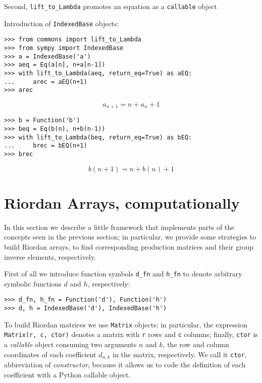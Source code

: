 Second, \verb|lift_to_Lambda| promotes an equation as a \verb|callable| object

\begin{example}
Introduction of \verb|IndexedBase| objects:
\begin{verbatim}
>>> from commons import lift_to_Lambda
>>> from sympy import IndexedBase
>>> a = IndexedBase('a')
>>> aeq = Eq(a[n], n+a[n-1])
>>> with lift_to_Lambda(aeq, return_eq=True) as aEQ:
...     arec = aEQ(n+1)
>>> arec
\end{verbatim}
\begin{displaymath}
    a_{n + 1} = n + a_{n} + 1
\end{displaymath}
\begin{verbatim}
>>> b = Function('b')
>>> beq = Eq(b(n), n+b(n-1))
>>> with lift_to_Lambda(beq, return_eq=True) as bEQ:
...     brec = bEQ(n+1)
>>> brec
\end{verbatim}
\begin{displaymath}
    b{\left (n + 1 \right )} = n + b{\left (n \right )} + 1
\end{displaymath}
\end{example}

\section{Riordan Arrays, computationally}

In this section we describe a little framework that implements parts
of the concepts seen in the previous section; in particular, we provide
some strategies to build Riordan arrays, to find corresponding production
matrices and their group inverse elements, respectively.

First of all we introduce function symbols \verb|d_fn| and \verb|h_fn|
to denote arbitrary symbolic functions $d$ and $h$, respectively:
\begin{verbatim}
>>> d_fn, h_fn = Function('d'), Function('h')
>>> d, h = IndexedBase('d'), IndexedBase('h')
\end{verbatim}

To build Riordan matrices we use \verb|Matrix| objects; in particular, the
expression \verb|Matrix(r, c, ctor)| denotes a matrix with \verb|r| rows and
\verb|c| columns; finally, \verb|ctor| is a \textit{callable} object consuming
two arguments $n$ and $k$, the row and column coordinates of each coefficient
$d_{n,k}$ in the matrix, respectively. We call it \verb|ctor|, abbreviation of
\textit{constructor}, because it allows us to code the definition of each
coefficient with a Python callable object.

